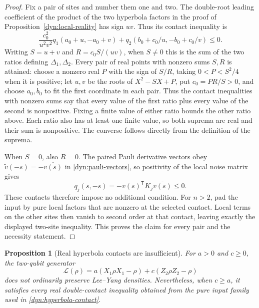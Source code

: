 \documentclass[reqno]{amsart}
\newtheorem{proposition}[theorem]{Proposition}
\theoremstyle{definition}
\theoremstyle{remark}
\begin{document}
\begin{proof}
Fix a pair of sites and number them one and two.
The double-root leading coefficient of the product of the two hyperbola
factors in the proof of Proposition~\ref{dyn:local-reality} has sign $uv$.
Thus its contact inequality is
\[
 \frac{c_0^2}{u^2v^2}q_1(a_0+u,-a_0+v)
 +q_2(b_0+c_0/u,-b_0+c_0/v)\le0.
\]
Writing $S=u+v$ and $R=c_0S/(uv)$, when $S\ne0$ this is the sum of the
two ratios defining $\Delta_1,\Delta_2$.  Every pair of real points with
nonzero sums $S,R$ is attained: choose a nonzero real $P$ with the sign
of $S/R$, taking $0<P<S^2/4$ when it is positive; let $u,v$ be the roots
of $X^2-SX+P$, put $c_0=PR/S>0$, and choose $a_0,b_0$ to fit the first
coordinate in each pair.  Thus the contact inequalities with nonzero
sums say that every value of the first ratio plus every value of the
second is nonpositive.  Fixing a finite value of either ratio bounds
the other ratio above.  Each ratio also has at least one finite value,
so both suprema are real and their sum is nonpositive.  The converse
follows directly from the definition of the suprema.

When $S=0$, also $R=0$.  The paired Pauli derivative vectors obey
$\widetilde v(-s)=-\overline{v(s)}$ in \eqref{dyn:pauli-vectors}, so positivity of the local noise matrix
gives
\[
 q_j(s,-s)=-v(s)^{\mathsf T}K_j\overline{v(s)}\le0.
\]
These contacts therefore impose no additional condition.  For $n>2$,
pad the input by pure local factors that are nonzero at the selected
contact.  Local terms on the other sites then vanish to second order
at that contact, leaving exactly the displayed two-site inequality.
This proves the claim for every pair and the necessity statement.
\end{proof}

\begin{proposition}[Real hyperbola contacts are insufficient]\label{dyn:compensation}
For $a>0$ and $c\ge0$, the two-qubit generator
\[
 \mathcal L(\rho)=a(X_1\rho X_1-\rho)+c(Z_2\rho Z_2-\rho)
\]
does not ordinarily preserve Lee--Yang densities.  Nevertheless, when
$c\ge a$, it satisfies every real double-contact inequality obtained
from the pure input family used in \eqref{dyn:hyperbola-contact}.
\end{proposition}
\end{document}
